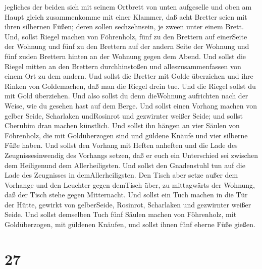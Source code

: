 jegliches der beiden sich mit seinem Ortbrett von unten aufgeselle und
oben am Haupt gleich zusammenkomme mit einer Klammer,  daß
acht Bretter seien mit ihren silbernen Füßen; deren sollen sechzehnsein,
je zween unter einem Brett.  Und, sollst Riegel machen von
Föhrenholz, fünf zu den Brettern auf einerSeite der Wohnung
 und fünf zu den Brettern auf der andern Seite der Wohnung
und fünf zuden Brettern hinten an der Wohnung gegen dem Abend.
 Und sollst die Riegel mitten an den Brettern
durchhinstoßen und alleszusammenfassen von einem Ort zu dem andern.
 Und sollst die Bretter mit Golde überziehen und ihre
Rinken von Goldemachen, daß man die Riegel drein tue.  Und
die Riegel sollst du mit Gold überziehen. Und also sollst du denn
dieWohnung aufrichten nach der Weise, wie du gesehen hast auf dem Berge.
 Und sollst einen Vorhang machen von gelber Seide,
Scharlaken undRosinrot und gezwirnter weißer Seide; und sollst Cherubim
dran machen künstlich.  Und sollst ihn hängen an vier
Säulen von Föhrenholz, die mit Goldüberzogen sind und güldene Knäufe und
vier silberne Füße haben.  Und sollst den Vorhang mit
Heften anheften und die Lade des Zeugnissesinwendig des Vorhangs setzen,
daß er euch ein Unterschied sei zwischen dem Heiligenund dem
Allerheiligsten.  Und sollst den Gnadenstuhl tun auf die
Lade des Zeugnisses in demAllerheiligsten.  Den Tisch aber
setze außer dem Vorhange und den Leuchter gegen demTisch über, zu
mittagwärts der Wohnung, daß der Tisch stehe gegen Mitternacht.
 Und sollst ein Tuch machen in die Tür der Hütte, gewirkt
von gelberSeide, Rosinrot, Scharlaken und gezwirnter weißer Seide.
 Und sollst demselben Tuch fünf Säulen machen von
Föhrenholz, mit Goldüberzogen, mit güldenen Knäufen, und sollst ihnen
fünf eherne Füße gießen.

\hypertarget{section-26}{%
\section{27}\label{section-26}}

